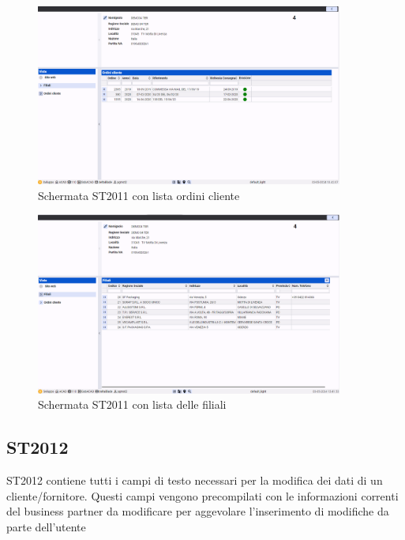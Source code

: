 \documentclass[target=bach,aauheader=,style=]{thud}
\begin{document}
\begin{figure}[H]
    \centering
    \includegraphics[width=0.9\textwidth, trim=0cm 0cm 0cm 0cm, clip]{st2/ST2011 ordini.png}
    \caption{Schermata ST2011 con lista ordini cliente}
\end{figure}

\begin{figure}[H]
    \centering
    \includegraphics[width=0.9\textwidth, trim=0cm 0cm 0cm 0cm, clip]{st2/ST2011 filiali.png}
    \caption{Schermata ST2011 con lista delle filiali}
\end{figure}



\subsection{ST2012}
ST2012 contiene tutti i campi di testo necessari per la modifica dei dati di un cliente/fornitore.
Questi campi vengono precompilati con le informazioni correnti del business partner da modificare per aggevolare l'inserimento di modifiche da parte dell'utente
\end{document}
